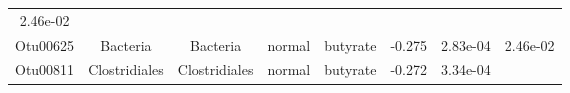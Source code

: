 \documentclass[11pt,]{article}
\begin{document}
\begin{longtable}[]{@{}cccccccc@{}}
\begin{minipage}[t]{0.08\columnwidth}
2.46e-02\strut
\end{minipage}\tabularnewline
\begin{minipage}[t]{0.08\columnwidth}\centering\strut
Otu00625\strut
\end{minipage} & \begin{minipage}[t]{0.15\columnwidth}\centering\strut
Bacteria\strut
\end{minipage} & \begin{minipage}[t]{0.15\columnwidth}\centering\strut
Bacteria\strut
\end{minipage} & \begin{minipage}[t]{0.08\columnwidth}\centering\strut
normal\strut
\end{minipage} & \begin{minipage}[t]{0.09\columnwidth}\centering\strut
butyrate\strut
\end{minipage} & \begin{minipage}[t]{0.07\columnwidth}\centering\strut
-0.275\strut
\end{minipage} & \begin{minipage}[t]{0.08\columnwidth}\centering\strut
2.83e-04\strut
\end{minipage} & \begin{minipage}[t]{0.08\columnwidth}\centering\strut
2.46e-02\strut
\end{minipage}\tabularnewline
\begin{minipage}[t]{0.08\columnwidth}\centering\strut
Otu00811\strut
\end{minipage} & \begin{minipage}[t]{0.15\columnwidth}\centering\strut
Clostridiales\strut
\end{minipage} & \begin{minipage}[t]{0.15\columnwidth}\centering\strut
Clostridiales\strut
\end{minipage} & \begin{minipage}[t]{0.08\columnwidth}\centering\strut
normal\strut
\end{minipage} & \begin{minipage}[t]{0.09\columnwidth}\centering\strut
butyrate\strut
\end{minipage} & \begin{minipage}[t]{0.07\columnwidth}\centering\strut
-0.272\strut
\end{minipage} & \begin{minipage}[t]{0.08\columnwidth}\centering\strut
3.34e-04\strut
\end{minipage} & \begin{minipage}[t]{0.08\columnwidth}\centering\strut

\end{minipage}
\end{longtable}
\end{document}
